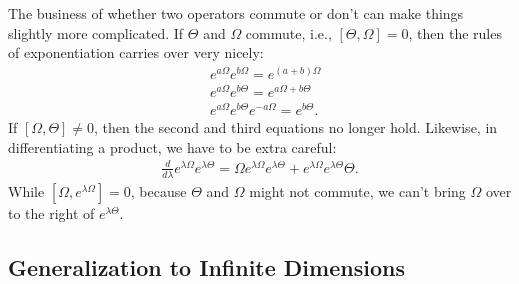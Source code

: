 \documentclass{book}
\theoremstyle{definition}
\newcommand{\f}[2]{\frac{#1}{#2}}
\begin{document}
The business of whether two operators commute or don't can make things slightly more complicated. If $\Theta$ and $\Omega$ commute, i.e., $[\Theta, \Omega] = 0$, then the rules of exponentiation carries over very nicely:
\begin{align}
&e^{a\Omega}e^{b\Omega} = e^{(a + b)\Omega}\\
&e^{a\Omega}e^{b\Theta} = e^{a\Omega + b\Theta}\\
&e^{a\Omega}e^{b\Theta}e^{-a\Omega} = e^{b\Theta}.
\end{align}
If $[\Omega, \Theta] \neq 0$, then the second and third equations no longer hold. Likewise, in differentiating a product, we have to be extra careful:
\begin{align}
\f{d}{d\lambda}e^{\lambda\Omega}e^{\lambda\Theta} = \Omega e^{\lambda\Omega}e^{\lambda\Theta} + e^{\lambda\Omega}e^{\lambda\Theta}\Theta.
\end{align}
While $[\Omega, e^{\lambda\Omega}] = 0$, because $\Theta$ and $\Omega$ might not commute, we can't bring $\Omega$ over to the right of $e^{\lambda\Theta}$. 


\subsection{Generalization to Infinite Dimensions}
\end{document}
